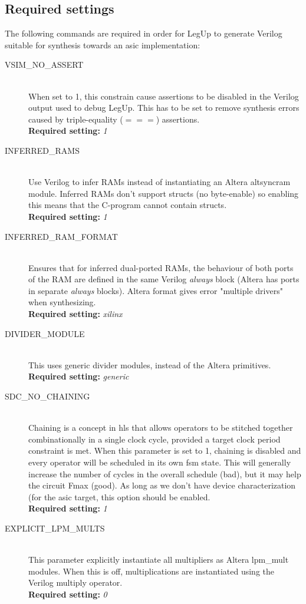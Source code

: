 \subsection{Required settings}
The following commands are required in order for LegUp to generate Verilog suitable for synthesis towards an \gls{asic} implementation:
\begin{description}
  \item[VSIM\_NO\_ASSERT] \hfill \\
      When set to 1, this constrain cause assertions to be disabled in the Verilog output used to debug LegUp. This has to be set to remove synthesis errors caused by triple-equality ($===$) assertions. \hfill \\
      \textbf{Required setting:} \textit{1}
  \item[INFERRED\_RAMS] \hfill \\
      Use Verilog to infer RAMs instead of instantiating an Altera altsyncram module. Inferred RAMs don’t support structs (no byte-enable) so enabling this means that the C-program cannot contain structs. \hfill \\
      \textbf{Required setting:} \textit{1}
  \item[INFERRED\_RAM\_FORMAT] \hfill \\
      Ensures that for inferred dual-ported RAMs, the behaviour of both ports of the RAM are defined in the same Verilog \textit{always} block (Altera has ports in separate \textit{always} blocks). Altera format gives error "multiple drivers" when synthesizing.\hfill \\
      \textbf{Required setting:} \textit{xilinx}
  \item[DIVIDER\_MODULE] \hfill \\
      This uses generic divider modules, instead of the Altera primitives.\hfill \\
      \textbf{Required setting:} \textit{generic}
  \item[SDC\_NO\_CHAINING] \hfill \\
      Chaining is a concept in \gls{hls} that allows operators to be stitched together combinationally in a single clock cycle, provided a target clock period constraint is met. When this parameter is set to 1, chaining is disabled and every operator will be scheduled in its own \gls{fsm} state. This will generally increase the number of cycles in the overall schedule (bad), but it may help the circuit Fmax (good). As long as we don't have device characterization (for the \gls{asic} target, this option should be enabled.\hfill \\
      \textbf{Required setting:} \textit{1}
  \item[EXPLICIT\_LPM\_MULTS] \hfill \\
      This parameter explicitly instantiate all multipliers as Altera lpm\_mult modules. When this is off, multiplications are instantiated using the Verilog multiply operator.\hfill \\
      \textbf{Required setting:} \textit{0}
\end{description}
